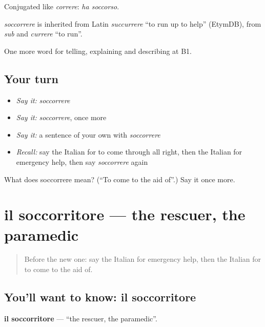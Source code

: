 Conjugated like \emph{correre}: \emph{ha soccorso}.

\begin{cousinweb}
\emph{soccorrere} is inherited from Latin \emph{succurrere} \textquotedblleft{}to run up to help\textquotedblright{} (EtymDB), from \emph{sub} and \emph{currere} \textquotedblleft{}to run\textquotedblright{}.
\end{cousinweb}

\begin{grammarlens}[title={What you've built}]
One more word for telling, explaining and describing at B1.
\end{grammarlens}

\subsection*{Your turn}
\begin{itemize}
\raggedright
  \item \emph{Say it:} \emph{soccorrere}
  \item \emph{Say it:} \emph{soccorrere}, once more
  \item \emph{Say it:} a sentence of your own with \emph{soccorrere}
  \item \emph{Recall:} say the Italian for to come through all right, then the Italian for emergency help, then say \emph{soccorrere} again
\end{itemize}

\begin{tcolorbox}[breakable,colback=teal!4,colframe=teal!35!black,title={Before you move on}]
What does soccorrere mean? (\textquotedblleft{}To come to the aid of\textquotedblright{}.) Say it once more.
\end{tcolorbox}
\section[il soccorritore]{il soccorritore — the rescuer, the paramedic}

\label{lesson:IT-C301-soccorritore}



\begin{quote}
Before the new one: say the Italian for emergency help, then the Italian for to come to the aid of.
\end{quote}

\subsection*{You'll want to know: il soccorritore}
\textbf{il soccorritore} — \textquotedblleft{}the rescuer, the paramedic\textquotedblright{}.

